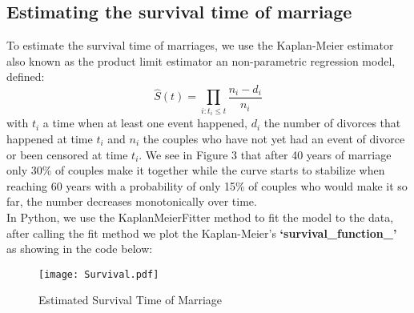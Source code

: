 \documentclass[10pt,twocolumn]{article}
\begin{document}
\subsection{Estimating the survival time of marriage}
To estimate the survival time of marriages, we use the Kaplan-Meier estimator also known as the product limit estimator an non-parametric regression model, defined:
\begin{equation}
\hat{S}(t) = \prod_{i:t_{i} \leq t} \frac{n_i - d_i}{n_i}
\end{equation}
with $t_{i}$ a time when at least one event happened, $d_i$ the number of divorces that happened at time $t_{i}$ and  $n_{i}$ the couples who have not yet had an event of divorce or been censored at time $t_{i}$.
We see in Figure 3 that after 40 years of marriage only 30\% of couples make it together while the curve starts to stabilize when reaching 60 years with a probability of only 15\% of couples who would make it so far, the number decreases monotonically over time.\\
In Python, we use the KaplanMeierFitter method to fit the model to the data, after calling the fit method we plot the Kaplan-Meier's \textbf{`survival\_function\_'} as showing in the code below:

\begin{figure}[!htb]
\centering
\texttt{[image: Survival.pdf]}
\caption{Estimated Survival Time of Marriage}
\label{Fig:Survival_Time}
\end{figure}
\end{document}
